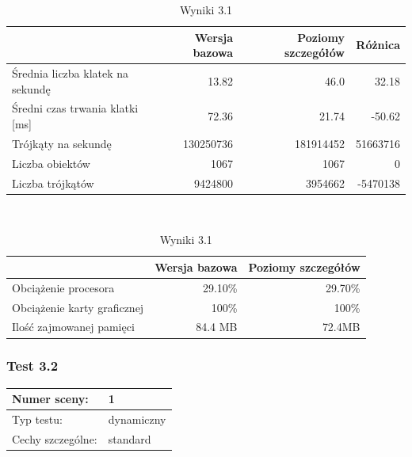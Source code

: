 \documentclass[a4paper,twoside,12pt]{book}
\begin{document}
\begin{table}[H]
    \centering
    \caption{Wyniki 3.1}
    \label{tab:lod_test1}
    \begin{tabular}{|l||r|r|r|}
        \hline
        & Wersja bazowa & Poziomy szczegółów & Różnica \\
        \hline
        Średnia liczba klatek na sekundę & 13.82 & 46.0 & 32.18 \\
        \hline
        Średni czas trwania klatki [ms] & 72.36 & 21.74 & -50.62 \\
        \hline
        Trójkąty na sekundę & 130250736 & 181914452 & 51663716 \\
        \hline
        Liczba obiektów & 1067 & 1067 & 0 \\
        \hline
        Liczba trójkątów & 9424800 & 3954662 & -5470138 \\
        \hline
    \end{tabular} \\
    
    \vspace*{0.5 cm}
    
    
    \begin{tabular}{|l||r|r|}
         \hline
        & Wersja bazowa & Poziomy szczegółów \\
         \hline
        Obciążenie procesora & 29.10\% & 29.70\% \\
        \hline
        Obciążenie karty graficznej & 100\% & 100\% \\
        \hline
        Ilość zajmowanej pamięci & 84.4 MB & 72.4MB \\
        \hline
    \end{tabular}
\end{table}

\vbox{}

\subsubsection{Test 3.2}
\begin{tabular}{|l||l|}
\hline
Numer sceny: & 1 \\
\hline
Typ testu: & dynamiczny \\
\hline
Cechy szczególne: & standard \\
\hline
\end{tabular}\\

\vbox{}
\end{document}
